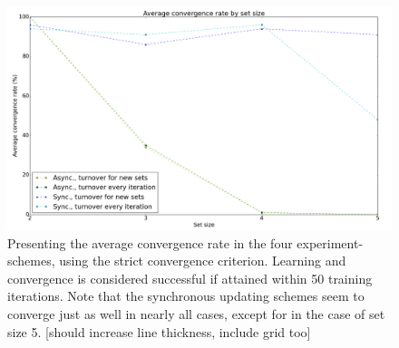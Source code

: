 \begin{figure}
    \centering
    \includegraphics[width=13cm]{fig/avg_convergence_rate_cut}
    \caption{Presenting the average convergence rate in the four experiment-schemes, using the strict convergence criterion. Learning and convergence is considered successful if attained within 50 training iterations. Note that the synchronous updating schemes seem to converge just as well in nearly all cases, except for in the case of set size 5.   [should increase line thickness, include grid too]}
    \label{fig:convergence_rates_async_sync}
\end{figure}

